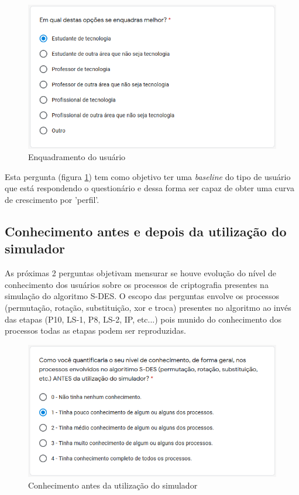 \begin{figure}[H]
    \centering
    \caption{Enquadramento do usuário}
    \label{fig:enquadramentousuario}
    \includegraphics[width=0.75\linewidth]{Questionario/Q1.png}
\end{figure}

Esta pergunta (figura \ref{fig:enquadramentousuario}) tem como objetivo ter uma \textit{baseline} do tipo de usuário que está respondendo o questionário e dessa forma ser capaz de obter uma curva de crescimento por 'perfil'.

\subsection{Conhecimento antes e depois da utilização do simulador}
As próximas 2 perguntas objetivam mensurar se houve evolução do nível de conhecimento dos usuários sobre os processos de criptografia presentes na simulação do algoritmo S-DES. O escopo das perguntas envolve os processos (permutação, rotação, substituição, xor e troca) presentes no algoritmo ao invés das etapas (P10, LS-1, P8, LS-2, IP, etc...) pois munido do conhecimento dos processos todas as etapas podem ser reproduzidas.

\begin{figure}[H]
    \centering
    \caption{Conhecimento antes da utilização do simulador}
    \label{fig:conhecimentoantes}
    \includegraphics[width=0.75\linewidth]{Questionario/Q2.png}
\end{figure}

